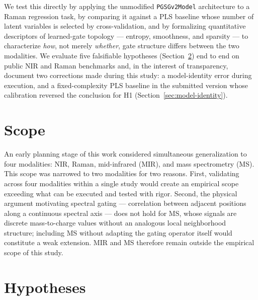 \documentclass[preprint,12pt]{elsarticle}
\begin{document}
We test this directly by applying the unmodified \texttt{PGSGv2Model} architecture to a Raman regression task, by comparing it against a PLS baseline whose number of latent variables is selected by cross-validation, and by formalizing quantitative descriptors of learned-gate topology --- entropy, smoothness, and sparsity --- to characterize \emph{how}, not merely \emph{whether}, gate structure differs between the two modalities. We evaluate five falsifiable hypotheses (Section~\ref{sec:hypotheses}) end to end on public NIR and Raman benchmarks and, in the interest of transparency, document two corrections made during this study: a model-identity error during execution, and a fixed-complexity PLS baseline in the submitted version whose calibration reversed the conclusion for H1 (Section~\ref{sec:model-identity}).

\section{Scope}
\label{sec:scope}

An early planning stage of this work considered simultaneous generalization to four modalities: NIR, Raman, mid-infrared (MIR), and mass spectrometry (MS). This scope was narrowed to two modalities for two reasons. First, validating across four modalities within a single study would create an empirical scope exceeding what can be executed and tested with rigor. Second, the physical argument motivating spectral gating --- correlation between adjacent positions along a continuous spectral axis --- does not hold for MS, whose signals are discrete mass-to-charge values without an analogous local neighborhood structure; including MS without adapting the gating operator itself would constitute a weak extension. MIR and MS therefore remain outside the empirical scope of this study.

\section{Hypotheses}
\label{sec:hypotheses}
\end{document}

